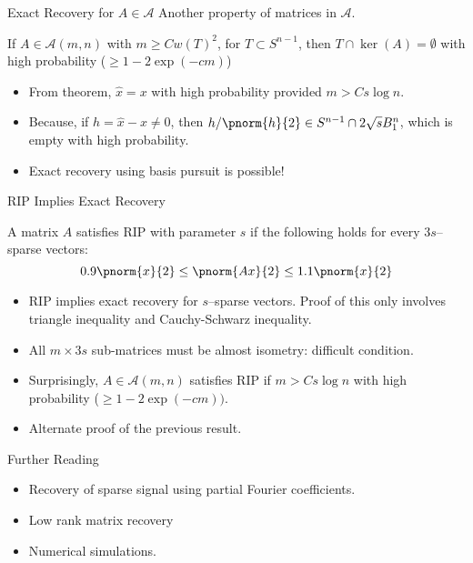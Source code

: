 \documentclass{beamer}
\begin{document}
\begin{frame}{Exact Recovery for $A\in\mathcal{A}$}
	Another property of matrices in $\mathcal{A}$.
	\begin{theorem}
		If $A\in\mathcal{A}(m, n)$ with $m\geq Cw(T)^2$, for
		$T\subset S^{n-1}$, then $T\cap \ker(A) = \emptyset$
		with high probability ($\geq 1-2\exp(-cm)$)
	\end{theorem}

	\pause

	\begin{itemize}
		\item From theorem, $\hat{x} = x$ with high
			probability provided $m>Cs\log n$.

		\item Because, if $h = \hat{x}-x\neq 0$, then
			$h/\pnorm{h}{2}\in S^{n-1}\cap 2\sqrt{s}B_1^n$, which
			is empty with high probability.

			\pause

		\item Exact recovery using basis pursuit is possible!
	\end{itemize}
\end{frame}


\begin{frame}{RIP Implies Exact Recovery}
	\begin{definition}[RIP]
		A matrix $A$ satisfies \mbox{RIP} with parameter $s$
		if the following holds for every $3s$--sparse vectors:
		\[
			0.9\pnorm{x}{2}\leq \pnorm{Ax}{2}\leq 1.1\pnorm{x}{2}
		\]
	\end{definition}
	\pause
	
	\begin{itemize}
		\item \mbox{RIP} implies exact recovery for $s$--sparse
			vectors. Proof of this only involves triangle inequality
			and Cauchy-Schwarz inequality.

			\pause

		\item All $m\times 3s$ sub-matrices must be almost isometry:
			difficult condition.

			\pause

		\item Surprisingly, $A\in\mathcal{A}(m, n)$
			satisfies \mbox{RIP}
			if $m>Cs\log n$ with high probability
			($\geq 1-2\exp(-cm))$.

		\item Alternate proof of the previous result.

	\end{itemize}
			
\end{frame}
	
\begin{frame}{Further Reading}
	\begin{itemize}
		\item Recovery of sparse signal using partial Fourier
			coefficients.
	
			\vspace{10mm}
			\pause

		\item Low rank matrix recovery

			\vspace{10mm}
			\pause

		\item Numerical simulations.
	\end{itemize}
\end{frame}
\end{document}

